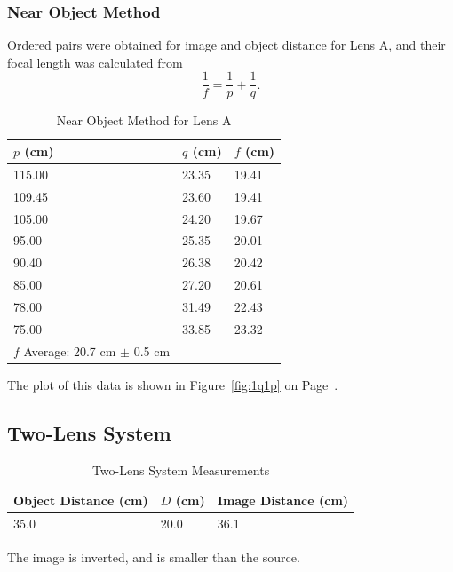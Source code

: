 \documentclass[twocolumn,english]{IEEEtran}
\theoremstyle{plain}
\theoremstyle{plain}
\begin{document}
\subsubsection{Near Object Method}

Ordered pairs were obtained for image and object distance for Lens A, and their focal length was calculated from
\begin{equation}
	\frac{1}{f} = \frac{1}{p} + \frac{1}{q}.
\end{equation}

\begin{table}[H]
	\caption{Near Object Method for Lens A}
	\label{tb:nearobj}
	\centering
	\begin{tabular}{@{}lll@{}}
	\toprule
	$p$ (cm)      & $q$ (cm)     & $f$ (cm)     \\ \midrule
	115.00    	& 23.35 	& 19.41 \\
	109.45 		& 23.60  	& 19.41 \\
	105.00    	& 24.20  	& 19.67 \\
	95.00     	& 25.35 	& 20.01 \\
	90.40   	& 26.38 	& 20.42 \\
	85.00     	& 27.20  	& 20.61 \\
	78.00     	& 31.49 	& 22.43 \\
	75.00     	& 33.85 	& 23.32 \\ \midrule
	$f$ Average: 20.7 cm $\pm$ 0.5 cm \\ \bottomrule
	\end{tabular}
\end{table}
The plot of this data is shown in Figure~\ref{fig:1q1p} on Page~\pageref{fig:1q1p}.


\subsection{Two-Lens System}

\begin{table}[H]
\caption{Two-Lens System Measurements}
\label{tb:twolens}
\centering
\begin{tabular}{@{}lll@{}}
\toprule
 Object Distance  (cm) & $D$ (cm) & Image Distance (cm)  \\ \midrule
 35.0 & 20.0  & 36.1 \\ \bottomrule
\end{tabular}
\end{table}

The image is inverted, and is smaller than the source.
\end{document}
